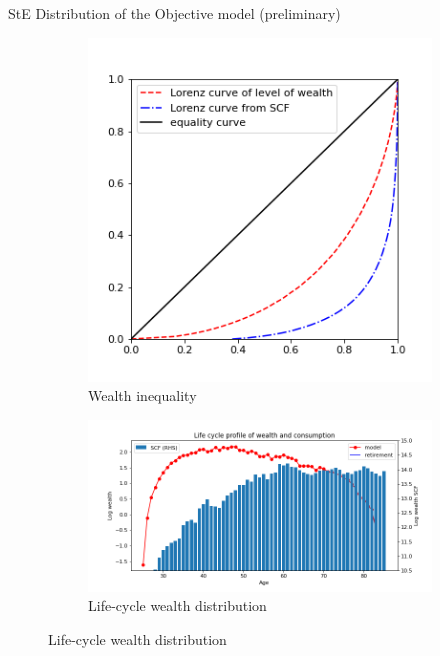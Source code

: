 \documentclass{beamer}
\begin{document}
\begin{frame}{StE Distribution of the Objective model (preliminary)}
	\label{objectivemodelresults}
	
		\begin{figure}[ht]
		\centering
		\begin{subfigure}[b]{0.30\textwidth}
			\caption{Wealth inequality}
			\includegraphics[width=\textwidth]{figures/lorenz_curve_a_eq.png}
		\end{subfigure}
		\begin{subfigure}[b]{0.6\textwidth}
			\caption{Life-cycle wealth distribution}
			\includegraphics[width=\textwidth]{figures/life_cycle_a_eq.png}
		\end{subfigure} 
	\end{figure}
\hyperlink{appendix:calibration}{}  \hyperlink{appendix:partial_eq}{} 
\end{frame}
\end{document}
